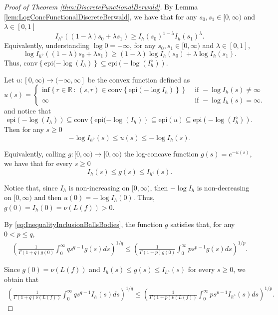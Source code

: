 \documentclass{amsart}
\newcommand{\R}{\mathbb R}
\theoremstyle{remark}
\theoremstyle{definition}
\numberwithin{equation}{section}
\begin{document}
\begin{proof}[Proof of  Theorem \ref{thm:DiscreteFunctionalBerwald}]

By Lemma \ref{lem:LogConcFunctionalDiscreteBerwald}, we have that for any $s_0,s_1 \in [0, \infty)$ and $\lambda\in [0,1]$
$$
I_{h^{\diamond}} ((1-\lambda)s_0 + \lambda s_1) \geq I_h(s_0)^{1-\lambda} I_h(s_1)^{\lambda}.
$$
Equivalently, understanding $\log 0=-\infty$, for any $s_0,s_1 \in [0, \infty)$ and $\lambda \in [0,1]$,
$$
\log I_{h^{\diamond}} ((1-\lambda)s_0 + \lambda s_1) \geq (1-\lambda) \log I_h(s_0) + \lambda \log I_h(s_1).
$$
Thus, $\textrm{conv}\left\{\textrm{epi}(-\log(I_h)\right\}\subseteq\textrm{epi}(-\log(I_h^\diamond))$.

\medskip

Let $u:[0,\infty) \to (-\infty, \infty]$ be the convex function defined as
$$
u(s)=\begin{cases}\textrm{inf}\left\{r\in\R\,:\,(s,r)\in\textrm{conv}\left\{\textrm{epi}(-\log  I_h)\right\}\right\} &\textrm{ if } -\log  I_h(s)\neq\infty\\
\infty&\textrm{ if } -\log  I_h(s)=\infty.
\end{cases}
$$
and notice that
$$
\textrm{epi}(-\log(I_h))\subseteq\textrm{conv}\left\{\textrm{epi}(-\log(I_h)\right\}\subseteq\textrm{epi}(u)\subseteq\textrm{epi}(-\log(I_h^\diamond)).
$$
Then for any $s \geq 0$
$$
-\log I_{h^{\diamond}}(s) \leq u(s) \leq -\log  I_h(s).
$$

Equivalently, calling $g:[0,\infty)\to[0,\infty)$ the log-concave function $g(s)=e^{-u(s)}$, we have that for every $s\geq 0$
$$
I_h(s)\leq g(s)\leq I_{h^\diamond}(s).
$$

Notice that, since $I_h$ is non-increasing on $[0, \infty)$, then $-\log I_h$ is non-decreasing on $[0, \infty)$ and then $u(0)=-\log I_h(0)$. Thus, $g(0)=I_h(0)=\nu(L(f))>0$.

By \eqref{eq:InequalityInclusionBallsBodies}, the function $g$ satisfies that, for any $0<p\leq q$,
\begin{align*}
\left( \frac{1}{\Gamma(1+q) g(0)}  \int_0^{\infty}qs^{q-1}g(s) ds \right)^{1/q} \leq \left( \frac{1}{\Gamma(1+p) g(0) }  \int_0^{\infty} ps^{p-1}g(s) ds \right)^{1/p}.
\end{align*}

Since $g(0)=\nu(L(f))$ and $I_h(s) \leq g(s) \leq I_{h^{\diamond}}(s)$ for every $s\geq0$, we obtain that
\begin{align*}
\left( \frac{1}{\Gamma(1+q) \nu(L(f))}  \int_0^{\infty}qs^{q-1}I_h(s) ds \right)^{1/q} \leq \left( \frac{1}{\Gamma(1+p) \nu(L(f)) }  \int_0^{\infty} ps^{p-1} I_{h^{\diamond}}(s) ds \right)^{1/p}.
\end{align*}


\end{proof}
\end{document}
